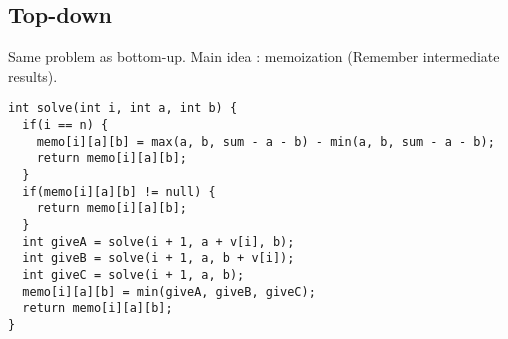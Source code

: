 \subsection{Top-down}
Same problem as bottom-up. Main idea : memoization (Remember intermediate results).
\begin{lstlisting}
int solve(int i, int a, int b) {
  if(i == n) {
    memo[i][a][b] = max(a, b, sum - a - b) - min(a, b, sum - a - b);
    return memo[i][a][b]; 
  }
  if(memo[i][a][b] != null) {
    return memo[i][a][b];
  }
  int giveA = solve(i + 1, a + v[i], b);
  int giveB = solve(i + 1, a, b + v[i]);
  int giveC = solve(i + 1, a, b);
  memo[i][a][b] = min(giveA, giveB, giveC);
  return memo[i][a][b];
}
\end{lstlisting}
